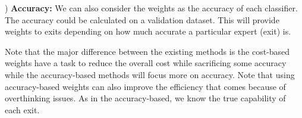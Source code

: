 ) \textbf{Accuracy:} We can also consider the weights as the accuracy of each classifier. The accuracy could be calculated on a validation dataset. This will provide weights to exits depending on how much accurate a particular expert (exit) is. 

Note that the major difference between the existing methods is the cost-based weights have a task to reduce the overall cost while sacrificing some accuracy while the accuracy-based methods will focus more on accuracy. Note that using accuracy-based weights can also improve the efficiency that comes because of overthinking issues. As in the accuracy-based, we know the true capability of each exit.





